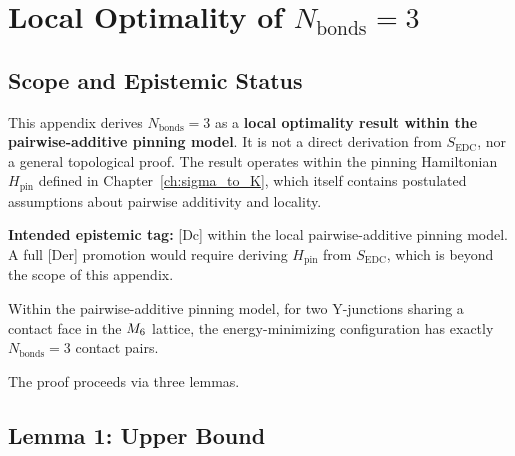 
\chapter{Local Optimality of $N_{\text{bonds}} = 3$}
\label{app:nbonds}

\section*{Scope and Epistemic Status}

This appendix derives $N_{\text{bonds}} = 3$ as a \textbf{local optimality
result within the pairwise-additive pinning model}. It is not a direct
derivation from $S_{\text{EDC}}$, nor a general topological proof. The
result operates within the pinning Hamiltonian $H_{\text{pin}}$ defined in
Chapter~\ref{ch:sigma_to_K}, which itself contains postulated assumptions
about pairwise additivity and locality.

\textbf{Intended epistemic tag:} [Dc] within the local pairwise-additive
pinning model. A full [Der] promotion would require deriving $H_{\text{pin}}$
from $S_{\text{EDC}}$, which is beyond the scope of this appendix.


\begin{theorem}[Local Optimality of $N_{\text{bonds}} = 3$]
\label{thm:nbonds_optimality}
Within the pairwise-additive pinning model, for two Y-junctions sharing a
contact face in the $M_6$ lattice, the energy-minimizing configuration
has exactly $N_{\text{bonds}} = 3$ contact pairs.
\end{theorem}

The proof proceeds via three lemmas.

\section{Lemma 1: Upper Bound}

